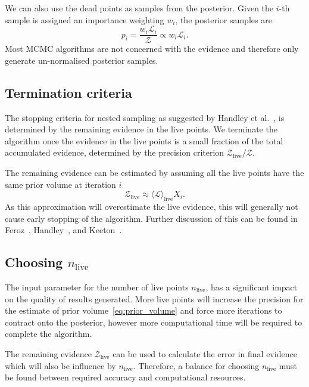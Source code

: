 \documentclass[11pt]{article}
\begin{document}
    We can also use the dead points as samples from the posterior.
    Given the $i$-th sample is assigned an importance weighting $w_i$, the posterior samples are
    \begin{equation}\label{eq:posterior_ns}
        p_i = \frac{w_i \mathcal{L}_i}{\mathcal{Z}} \propto w_i \mathcal{L}_i.
    \end{equation}
    Most MCMC algorithms are not concerned with the evidence and therefore only generate un-normalised posterior samples.

\subsection{Termination criteria}\label{subsec:termination_criteria}
    The stopping criteria for nested sampling as suggested by Handley et al.~\cite{Handley_2015}, is determined by
    the remaining evidence in the live points.
    We terminate the algorithm once the evidence in the live points is a small fraction of the total accumulated evidence,
    determined by the precision criterion $\mathcal{Z}_{\text{live}} / \mathcal{Z}$.

    The remaining evidence can be estimated by assuming all the live points have the same prior volume at iteration $i$
    \begin{equation}\label{eq:remaining_evidence}
    \mathcal{Z}_{\text{live}} \approx \langle \mathcal{L} \rangle_{\text{live}} X_i.
    \end{equation}
    As this approximation will overestimate the live evidence, this will generally not cause early stopping of the algorithm.
    Further discussion of this can be found in Feroz~\cite{Feroz_2009}, Handley~\cite{Handley_2015}, and
    Keeton~\cite{keeton2011statistical}.

    \subsection{Choosing $n_{\text{live}}$}\label{subsec:ns_termination}
    The input parameter for the number of live points $n_{\text{live}}$, has a significant impact on the quality of results generated.
    More live points will increase the precision for the estimate of prior volume~\ref{eq:prior_volume} and force more
    iterations to contract onto the posterior, however more computational time will be required to complete the algorithm.

    The remaining evidence $\mathcal{Z}_{\text{live}}$ can be used to calculate the error in final
    evidence~\cite{keeton2011statistical, Handley_2015} which will also be influence by $n_{\text{live}}$.
    Therefore, a balance for choosing $n_{\text{live}}$ must be found between required accuracy and computational resources.
\end{document}
